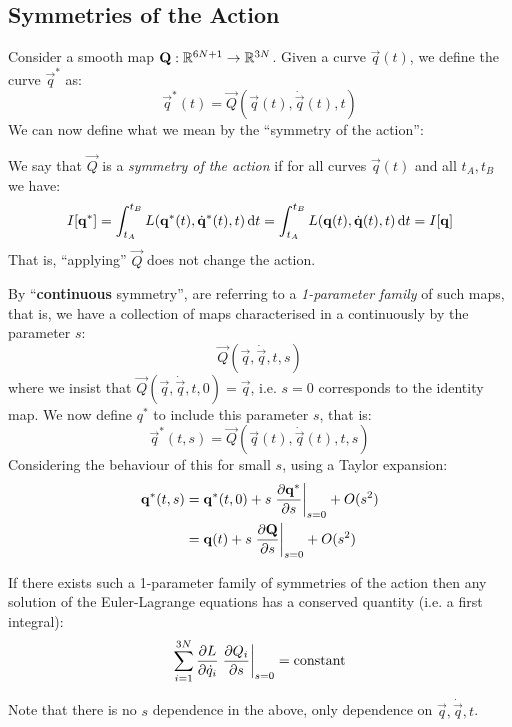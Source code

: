 \documentclass[../main.tex]{subfiles}
\begin{document}
\subsection{Symmetries of the Action}
Consider a smooth map $\mathbf{\bm{Q}}: \mathbb{R}^{6N + 1} \to \mathbb{R}^{3N}$.
Given a curve $\vec{q}(t)$, we define the curve $\vec{q}^{*}$ as:
\[
  \vec{q}^{*}(t) = \vec{Q}(\vec{q}(t), \dot{\vec{q}}(t), t)
\]
We can now define what we mean by the ``symmetry of the action'':
\begin{definition}
  We say that $\vec{Q}$  is a \textit{symmetry of the action} if for all curves $\vec{q}(t)$ and all $t_A, t_B$ we have: \label{symAct}
  \[
    I[\vec{q}^{*}] = \int_{t_A}^{t_B} L(\vec{q}^{*}(t), \dot{\vec{q}}^{*}(t), t) \d{t} = \int_{t_A}^{t_B} L(\vec{q}(t), \dot{\vec{q}}(t), t) \d{t} = I[\vec{q}]
  \]
  That is, ``applying'' $\vec{Q}$ does not change the action.
\end{definition}
By ``\textbf{continuous} symmetry'', are referring to a \textit{1-parameter family} of such maps, that is, we have a collection of maps characterised in a continuously by the parameter $s$:
\[
  \vec{Q}(\vec{q}, \dot{\vec{q}}, t, s)
\]
where we insist that $\vec{Q}(\vec{q}, \dot{\vec{q}}, t, 0) = \vec{q}$, i.e. $s = 0$ corresponds to the identity map.
We now define $q^{*}$ to include this parameter $s$, that is:
\begin{equation}
  \vec{q}^{*}(t, s) = \vec{Q}(\vec{q}(t), \dot{\vec{q}}(t), t, s) \label{smallS}
\end{equation}
Considering the behaviour of this for small $s$, using a Taylor expansion:
\begin{align*}
  \vec{q}^{*}(t, s) &= \vec{q}^{*}(t, 0) + s \at{\pderiv{\vec{q}^{*}}{s}}{s = 0} + O(s^2) \\
                    &= \vec{q}(t) + s \at{\pderiv{\vec{Q}}{s}}{s = 0} + O(s^2)
\end{align*}
\begin{theorem}
  If there exists such a 1-parameter family of symmetries of the action then any solution of the Euler-Lagrange equations has a conserved quantity (i.e. a first integral): \label{noetherV1}
  \[
    \sum_{i = 1}^{3N} \pderiv{L}{\dot{q}_i} \at{\pderiv{Q_i}{s}}{s = 0} = \text{constant}
  \]
\end{theorem}
\begin{remark}
  Note that there is no $s$ dependence in the above, only dependence on $\vec{q}, \dot{\vec{q}}, t$.
\end{remark}
\end{document}

